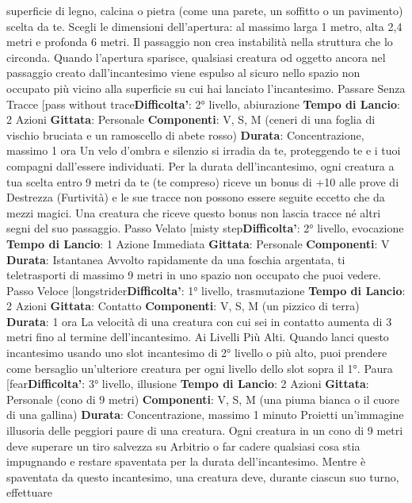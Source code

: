 \begin{multicols}{2}
superficie di legno, calcina o pietra (come una parete,
un soffitto o un pavimento) scelta da te. Scegli le
dimensioni dell’apertura: al massimo larga 1 metro, 
alta 2,4 metri e profonda 6 metri. Il passaggio non crea
instabilità nella struttura che lo circonda.
Quando l’apertura sparisce, qualsiasi creatura od
oggetto ancora nel passaggio creato dall’incantesimo
viene espulso al sicuro nello spazio non occupato più
vicino alla superficie su cui hai lanciato l’incantesimo.
Passare Senza Tracce
[pass without trace\textbf{Difficolta'}:
2° livello, abiurazione
\textbf{Tempo di Lancio}: 2 Azioni
\textbf{Gittata}: Personale
\textbf{Componenti}: V, S, M (ceneri di una foglia di vischio
bruciata e un ramoscello di abete rosso)
\textbf{Durata}: Concentrazione, massimo 1 ora
Un velo d’ombra e silenzio si irradia da te, proteggendo
te e i tuoi compagni dall’essere individuati. Per la durata
dell’incantesimo, ogni creatura a tua scelta entro 9 metri
da te (te compreso) riceve un bonus di +10 alle prove di
Destrezza (Furtività) e le sue tracce non possono
essere seguite eccetto che da mezzi magici. Una
creatura che riceve questo bonus non lascia tracce né
altri segni del suo passaggio.
Passo Velato
[misty step\textbf{Difficolta'}:
2° livello, evocazione
\textbf{Tempo di Lancio}: 1 Azione Immediata
\textbf{Gittata}: Personale
\textbf{Componenti}: V
\textbf{Durata}: Istantanea
Avvolto rapidamente da una foschia argentata, ti
teletrasporti di massimo 9 metri in uno spazio non
occupato che puoi vedere.
Passo Veloce
[longstrider\textbf{Difficolta'}:
1° livello, trasmutazione
\textbf{Tempo di Lancio}: 2 Azioni
\textbf{Gittata}: Contatto
\textbf{Componenti}: V, S, M (un pizzico di terra)
\textbf{Durata}: 1 ora
La velocità di una creatura con cui sei in contatto
aumenta di 3 metri fino al termine dell’incantesimo.
Ai Livelli Più Alti. Quando lanci questo incantesimo
usando uno slot incantesimo di 2° livello o più alto, puoi
prendere come bersaglio un’ulteriore creatura per ogni
livello dello slot sopra il 1°.
Paura
[fear\textbf{Difficolta'}:
3° livello, illusione
\textbf{Tempo di Lancio}: 2 Azioni
\textbf{Gittata}: Personale (cono di 9 metri)
\textbf{Componenti}: V, S, M (una piuma bianca o il cuore di
una gallina)
\textbf{Durata}: Concentrazione, massimo 1 minuto
Proietti un’immagine illusoria delle peggiori paure di una
creatura. Ogni creatura in un cono di 9 metri deve
superare un tiro salvezza su Arbitrio o far cadere
qualsiasi cosa stia impugnando e restare spaventata
per la durata dell’incantesimo.
Mentre è spaventata da questo incantesimo, una
creatura deve, durante ciascun suo turno, effettuare

\end{multicols}
